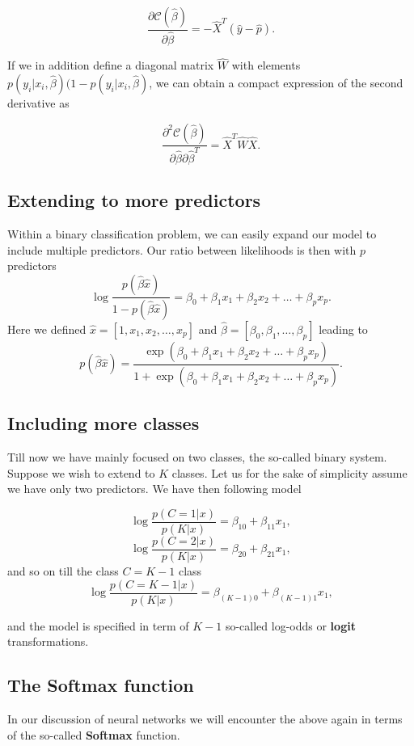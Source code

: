 \documentclass[%
oneside,                 %
final,                   %
10pt]{article}
\begin{document}
\[
\frac{\partial \mathcal{C}(\hat{\beta})}{\partial \hat{\beta}} = -\hat{X}^T\left(\hat{y}-\hat{p}\right). 
\]

If we in addition define a diagonal matrix $\hat{W}$ with elements 
$p(y_i\vert x_i,\hat{\beta})(1-p(y_i\vert x_i,\hat{\beta})$, we can obtain a compact expression of the second derivative as 

\[
\frac{\partial^2 \mathcal{C}(\hat{\beta})}{\partial \hat{\beta}\partial \hat{\beta}^T} = \hat{X}^T\hat{W}\hat{X}. 
\]

\subsection{Extending to more predictors}

Within a binary classification problem, we can easily expand our model to include multiple predictors. Our ratio between likelihoods is then with $p$ predictors
\[
\log{ \frac{p(\hat{\beta}\hat{x})}{1-p(\hat{\beta}\hat{x})}} = \beta_0+\beta_1x_1+\beta_2x_2+\dots+\beta_px_p.
\]
Here we defined $\hat{x}=[1,x_1,x_2,\dots,x_p]$ and $\hat{\beta}=[\beta_0, \beta_1, \dots, \beta_p]$ leading to
\[
p(\hat{\beta}\hat{x})=\frac{ \exp{(\beta_0+\beta_1x_1+\beta_2x_2+\dots+\beta_px_p)}}{1+\exp{(\beta_0+\beta_1x_1+\beta_2x_2+\dots+\beta_px_p)}}.
\]

\subsection{Including more classes}

Till now we have mainly focused on two classes, the so-called binary
system. Suppose we wish to extend to $K$ classes.  Let us for the sake
of simplicity assume we have only two predictors. We have then
following model

\[
\log{\frac{p(C=1\vert x)}{p(K\vert x)}} = \beta_{10}+\beta_{11}x_1,
\]
\[
\log{\frac{p(C=2\vert x)}{p(K\vert x)}} = \beta_{20}+\beta_{21}x_1,
\]
and so on till the class $C=K-1$ class
\[
\log{\frac{p(C=K-1\vert x)}{p(K\vert x)}} = \beta_{(K-1)0}+\beta_{(K-1)1}x_1,
\]

and the model is specified in term of $K-1$ so-called log-odds or
\textbf{logit} transformations.


\subsection{The Softmax function}

In our discussion of neural networks we will encounter the above again
in terms of the so-called \textbf{Softmax} function.
\end{document}
